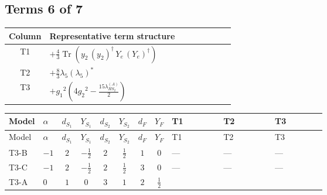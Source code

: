 \documentclass[8pt]{article}
\begin{document}
\begin{landscape}
\subsection*{Terms 6 of 7}
\begin{center}
\begin{tabular}{@{}c >{\raggedright\arraybackslash}p{0.82\linewidth}@{}}
\toprule
Column & Representative term structure \\
\midrule
T1 & \(\displaystyle +\frac{4}{3} \operatorname{Tr}\!\left({y_2}\,\left({y_2}\right)^{\dagger}\,{Y_e}\,\left({Y_e}\right)^{\dagger}\right)\) \\
\midrule
T2 & \(\displaystyle +\frac{8}{3} {\lambda_5} \left({\lambda_5}\right)^{*}\) \\
\midrule
T3 & \(\displaystyle +{g_1}^2 \left(4 {g_2}^2-\frac{15 {\lambda_{HS_2}^{(A)}}}{2}\right)\) \\
\midrule
\bottomrule
\end{tabular}
\end{center}
\smallskip
\tiny
\begin{longtable}{@{}llcccccc >{\raggedright\arraybackslash}p{0.21\linewidth} >{\raggedright\arraybackslash}p{0.21\linewidth} >{\raggedright\arraybackslash}p{0.21\linewidth}@{}}
\toprule
Model & $\alpha$ & $d_{S_1}$ & $Y_{S_1}$ & $d_{S_2}$ & $Y_{S_2}$ & $d_F$ & $Y_F$ & T1 & T2 & T3 \\
\midrule
\endfirsthead
\toprule
Model & $\alpha$ & $d_{S_1}$ & $Y_{S_1}$ & $d_{S_2}$ & $Y_{S_2}$ & $d_F$ & $Y_F$ & T1 & T2 & T3 \\
\midrule
\endhead
T3-B & $-1$ & $2$ & $-\frac{1}{2}$ & $2$ & $\frac{1}{2}$ & $1$ & $0$ & --- & --- & --- \\
\midrule
T3-C & $-1$ & $2$ & $-\frac{1}{2}$ & $2$ & $\frac{1}{2}$ & $3$ & $0$ & --- & --- & --- \\
\midrule
T3-A & $0$ & $1$ & $0$ & $3$ & $1$ & $2$ & $\frac{1}{2}$ & \scriptsize\adjustbox{max width=\linewidth}{$\begin{gathered} +\frac{4}{3} \operatorname{Tr}\!\left({y_2}\,\left({y_2}\right)^{\dagger}\,{Y_e}\,\left({Y_e}\right)^{\dagger}\right)\end{gathered}$} & \scriptsize\adjustbox{max width=\linewidth}{$\begin{gathered} +\frac{8}{3} {\lambda_5} \left({\lambda_5}\right)^{*}\end{gathered}$} & \scriptsize\adjustbox{max width=\linewidth}{$\begin{gathered} +{g_1}^2 \left(4 {g_2}^2-\frac{15 {\lambda_{HS_2}^{(A)}}}{2}\right)\end{gathered}$} \\

\end{longtable}
\end{landscape}
\end{document}

